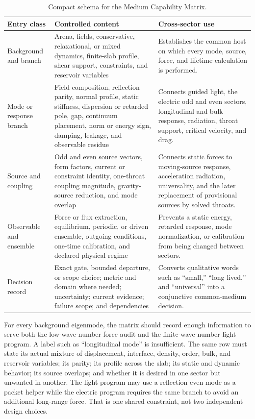 \begin{table}[htbp]
\centering
\caption{Compact schema for the Medium Capability Matrix.}
\label{tab:capability-matrix-schema}
\begin{tabularx}{\textwidth}{@{}L{0.20\textwidth}L{0.34\textwidth}Y@{}}
\toprule
\textbf{Entry class} & \textbf{Controlled content} & \textbf{Cross-sector use} \\
\midrule
Background and branch
& Arena, fields, conservative, relaxational, or mixed dynamics, finite-slab
  profile, shear support, constraints, and reservoir variables
& Establishes the common host on which every mode, source, force, and lifetime
  calculation is performed. \\
Mode or response branch
& Field composition, reflection parity, normal profile, static stiffness,
  dispersion or retarded pole, gap, continuum placement, norm or energy sign,
  damping, leakage, and observable residue
& Connects guided light, the electric odd and even sectors, longitudinal and
  bulk response, radiation, throat support, critical velocity, and drag. \\
Source and coupling
& Odd and even source vectors, form factors, current or constraint identity,
  one-throat coupling magnitude, gravity-source reduction, and mode overlap
& Connects static forces to moving-source response, acceleration radiation,
  universality, and the later replacement of provisional sources by solved
  throats. \\
Observable and ensemble
& Force or flux extraction, equilibrium, periodic, or driven ensemble,
  outgoing conditions, one-time calibration, and declared physical regime
& Prevents a static energy, retarded response, mode normalization, or
  calibration from being changed between sectors. \\
Decision record
& Exact gate, bounded departure, or scope choice; metric and domain where
  needed; uncertainty; current evidence; failure scope; and dependencies
& Converts qualitative words such as ``small,'' ``long lived,'' and
  ``universal'' into a conjunctive common-medium decision. \\
\bottomrule
\end{tabularx}
\end{table}

For every background eigenmode, the matrix should record enough information to
serve both the low-wave-number force audit and the finite-wave-number light
program. A label such as ``longitudinal mode'' is insufficient. The same row
must state its actual mixture of displacement, interface, density, order, bulk,
and reservoir variables; its parity; its profile across the slab; its static
and dynamic behavior; its source overlaps; and whether it is desired in one
sector but unwanted in another. The light program may use a reflection-even
mode as a packet helper while the electric program requires the same branch to
avoid an additional long-range force. That is one shared constraint, not two
independent design choices.

